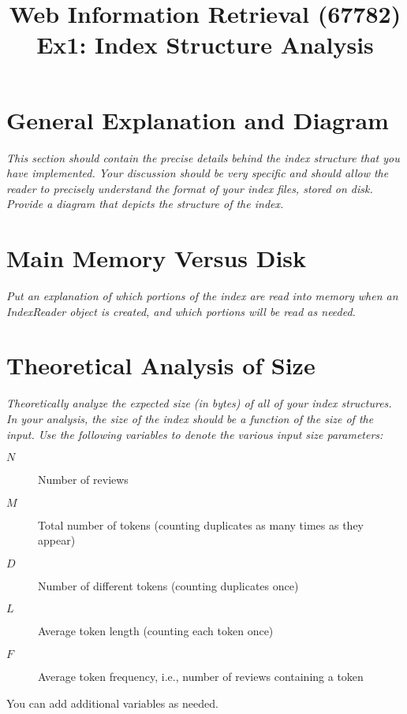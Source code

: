 \documentclass[11pt]{article}
\begin{document}
\title{Web Information Retrieval (67782)\\ Ex1: Index Structure Analysis}
\date{}

\maketitle
{}


\section{General Explanation and Diagram}

{\em This section should contain the  precise details behind the index structure that you have implemented. Your discussion should be very specific and should allow the reader to precisely understand the format of your index files, stored on disk. Provide a diagram that depicts the structure of the index. }

\section{Main Memory Versus Disk}

{\em Put an explanation of which portions of the index are read into memory when an IndexReader object is created, and which portions will be read as needed. }

\section{Theoretical Analysis of Size}

{\em Theoretically analyze the expected size (in bytes) of all of your index structures. In your
  analysis, the size of the index should be a function of the size of the
  input.  Use the following variables to denote the various input size parameters:
  \begin{description}
      \item[$N$] Number of reviews
      \item[$M$] Total number of tokens (counting duplicates as many times as they appear)
      \item[$D$] Number of different tokens (counting duplicates once)
      \item[$L$] Average token length (counting each token once)
      \item[$F$] Average token frequency, i.e., number of reviews containing a token
  \end{description}
  You can add additional variables as needed.}
  
\end{document}

